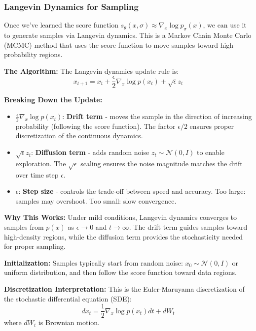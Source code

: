 \documentclass[12pt,a4paper]{article}
\begin{document}
\subsubsection{Langevin Dynamics for Sampling}

Once we've learned the score function $s_\theta(x, \sigma) \approx \nabla_x \log p_\sigma(x)$, we can use it to generate samples via Langevin dynamics. This is a Markov Chain Monte Carlo (MCMC) method that uses the score function to move samples toward high-probability regions.

\textbf{The Algorithm:} The Langevin dynamics update rule is:
\begin{equation}
x_{t+1} = x_t + \frac{\epsilon}{2}\nabla_x \log p(x_t) + \sqrt{\epsilon} z_t
\end{equation}

\textbf{Breaking Down the Update:}
\begin{itemize}
    \item $\frac{\epsilon}{2}\nabla_x \log p(x_t)$: \textbf{Drift term} - moves the sample in the direction of increasing probability (following the score function). The factor $\epsilon/2$ ensures proper discretization of the continuous dynamics.
    
    \item $\sqrt{\epsilon} z_t$: \textbf{Diffusion term} - adds random noise $z_t \sim \mathcal{N}(0, I)$ to enable exploration. The $\sqrt{\epsilon}$ scaling ensures the noise magnitude matches the drift over time step $\epsilon$.
    
    \item $\epsilon$: \textbf{Step size} - controls the trade-off between speed and accuracy. Too large: samples may overshoot. Too small: slow convergence.
\end{itemize}

\textbf{Why This Works:} Under mild conditions, Langevin dynamics converges to samples from $p(x)$ as $\epsilon \to 0$ and $t \to \infty$. The drift term guides samples toward high-density regions, while the diffusion term provides the stochasticity needed for proper sampling.

\textbf{Initialization:} Samples typically start from random noise: $x_0 \sim \mathcal{N}(0, I)$ or uniform distribution, and then follow the score function toward data regions.

\textbf{Discretization Interpretation:} This is the Euler-Maruyama discretization of the stochastic differential equation (SDE):
\begin{equation}
dx_t = \frac{1}{2}\nabla_x \log p(x_t) dt + dW_t
\end{equation}
where $dW_t$ is Brownian motion.
\end{document}
